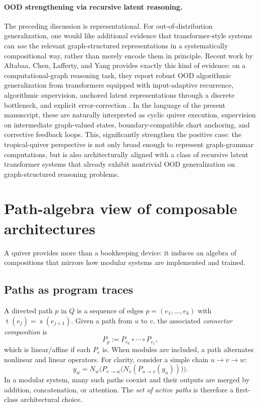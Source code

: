 \documentclass[11pt]{article}
\theoremstyle{definition}
\theoremstyle{plain}
\theoremstyle{remark}
\newcommand{\src}{\operatorname{s}}
\newcommand{\tgt}{\operatorname{t}}
\begin{document}
\paragraph{OOD strengthening via recursive latent reasoning.}
The preceding discussion is representational.
For out-of-distribution generalization, one would like additional evidence that transformer-style systems can \emph{use} the relevant graph-structured representations in a systematically compositional way, rather than merely encode them in principle.
Recent work by Altabaa, Chen, Lafferty, and Yang provides exactly this kind of evidence: on a computational-graph reasoning task, they report robust OOD algorithmic generalization from transformers equipped with input-adaptive recurrence, algorithmic supervision, anchored latent representations through a discrete bottleneck, and explicit error-correction \cite{AltabaaChenLaffertyYang2025}.
In the language of the present manuscript, these are naturally interpreted as cyclic quiver execution, supervision on intermediate graph-valued states, boundary-compatible chart anchoring, and corrective feedback loops. This, significantly strengthen the positive case: the tropical-quiver perspective is not only broad enough to represent graph-grammar computations, but is also architecturally aligned with a class of recursive latent transformer systems that already exhibit nontrivial OOD generalization on graph-structured reasoning problems.

\newpage

\section{Path-algebra view of composable architectures}
\label{sec:path-algebra}

A quiver provides more than a bookkeeping device: it induces an algebra of compositions that mirrors how modular systems are implemented and trained.

\subsection{Paths as program traces}
A directed path $p$ in $Q$ is a sequence of edges
$p=(e_1,\dots,e_k)$ with $\tgt(e_j)=\src(e_{j+1})$.
Given a path from $u$ to $v$, the associated \emph{connector composition} is
\[
P_p := P_{e_k}\circ \cdots \circ P_{e_1},
\]
which is linear/affine if each $P_e$ is.
When modules are included, a path alternates nonlinear and linear operators.
For clarity, consider a simple chain $u\to v\to w$:
\[
y_w = N_w\!\Big(P_{v\to w}\big( N_v(P_{u\to v}(y_u))\big)\Big).
\]
In a modular system, many such paths coexist and their outputs are merged by addition, concatenation, or attention.
The \emph{set of active paths} is therefore a first-class architectural choice.
\end{document}
